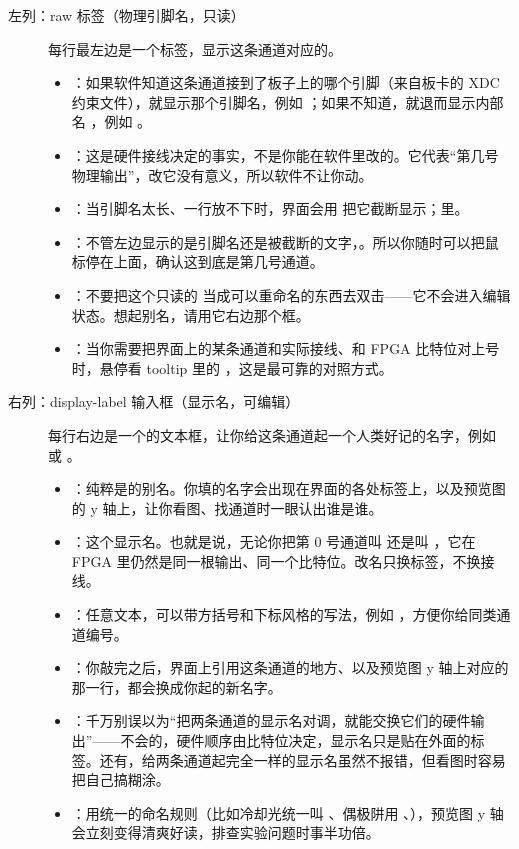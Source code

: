 \documentclass[11pt,oneside,openany]{book}
\begin{document}
\begin{description}
\item[左列：raw 标签（物理引脚名，只读）] 每行最左边是一个标签，显示这条通道对应的。
  \begin{itemize}
  \item {}：如果软件知道这条通道接到了板子上的哪个引脚（来自板卡的 XDC 约束文件），就显示那个引脚名，例如 ；如果不知道，就退而显示内部名 ，例如 。
  \item {}：这是硬件接线决定的事实，不是你能在软件里改的。它代表“第几号物理输出”，改它没有意义，所以软件不让你动。
  \item {}：当引脚名太长、一行放不下时，界面会用  把它截断显示；里。
  \item {}：不管左边显示的是引脚名还是被截断的文字，。所以你随时可以把鼠标停在上面，确认这到底是第几号通道。
  \item {}：不要把这个只读的  当成可以重命名的东西去双击——它不会进入编辑状态。想起别名，请用它右边那个框。
  \item {}：当你需要把界面上的某条通道和实际接线、和 FPGA 比特位对上号时，悬停看 tooltip 里的 ，这是最可靠的对照方式。
  \end{itemize}

\item[右列：display-label 输入框（显示名，可编辑）] 每行右边是一个的文本框，让你给这条通道起一个人类好记的名字，例如  或 。
  \begin{itemize}
  \item {}：纯粹是的别名。你填的名字会出现在界面的各处标签上，以及预览图的 y 轴上，让你看图、找通道时一眼认出谁是谁。
  \item {}：这个显示名。也就是说，无论你把第 0 号通道叫  还是叫 ，它在 FPGA 里仍然是同一根输出、同一个比特位。改名只换标签，不换接线。
  \item {}：任意文本，可以带方括号和下标风格的写法，例如 ，方便你给同类通道编号。
  \item {}：你敲完之后，界面上引用这条通道的地方、以及预览图 y 轴上对应的那一行，都会换成你起的新名字。
  \item {}：千万别误以为“把两条通道的显示名对调，就能交换它们的硬件输出”——不会的，硬件顺序由比特位决定，显示名只是贴在外面的标签。还有，给两条通道起完全一样的显示名虽然不报错，但看图时容易把自己搞糊涂。
  \item {}：用统一的命名规则（比如冷却光统一叫 、偶极阱用 、），预览图 y 轴会立刻变得清爽好读，排查实验问题时事半功倍。
  \end{itemize}
\end{description}
\end{document}
